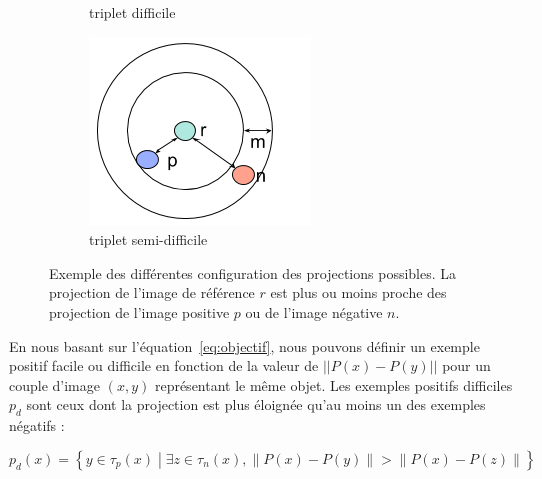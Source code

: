 \begin{figure}[htbp]
\begin{subfigure}{0.32\textwidth}
\caption{triplet difficile} \label{fig:exempledifficile}
\end{subfigure}
\hspace*{\fill} %
\begin{subfigure}{0.32\textwidth}
\includegraphics[width=\columnwidth]{figures/exemplesemidifficile.png}
\caption{triplet semi-difficile} \label{fig:exemplesemidifficileb}
\end{subfigure}

\caption{Exemple des différentes configuration des projections possibles. La projection de l'image de référence $r$ est plus ou moins proche des projection de l'image positive $p$ ou de l'image négative $n$.} 
\label{fig:triplets}
\end{figure}




En nous basant sur l'équation~\ref{eq:objectif}, nous pouvons définir un exemple positif facile ou difficile en fonction de la valeur de $||P(x) - P(y)||$ pour un couple d'image $(x,y)$ représentant le même objet. 
Les exemples positifs difficiles $p_d$ sont ceux dont la projection est plus éloignée qu'au moins un des exemples négatifs :

\begin{equation}
p_d(x) = \left\{ y \in \tau_p(x) \middle| \exists z \in \tau_n(x),  \|P(x) - P(y)\| > \|P(x) - P(z)\| \right\}
\label{eq:maxhard}
\end{equation}


